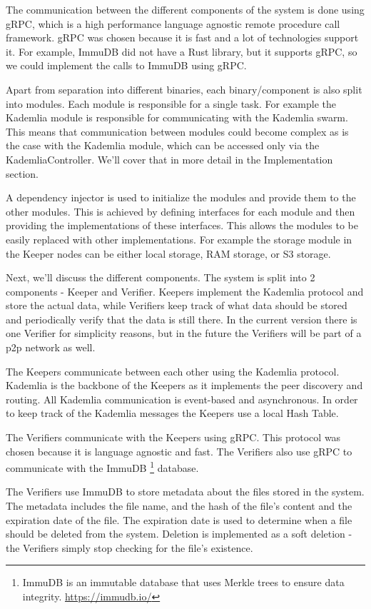 \documentclass[ twoside,openright,titlepage,numbers=noenddot,headinclude,%
                footinclude=true,cleardoublepage=empty,abstractoff, %
                BCOR=5mm,paper=a4,fontsize=11pt,%
                ngerman,american,%
                ]{scrreprt}
\begin{document}
The communication between the different components of the system is done using gRPC,
which is a high performance language agnostic remote procedure call framework.
gRPC was chosen because it is fast and a lot of technologies support it.
For example, ImmuDB did not have a Rust library, but it supports gRPC,
so we could implement the calls to ImmuDB using gRPC.

Apart from separation into different binaries, each binary/component is also split into modules.
Each module is responsible for a single task.
For example the Kademlia module is responsible for communicating with the Kademlia swarm.
This means that communication between modules could become complex as is the case with the Kademlia module,
which can be accessed only via the KademliaController.
We'll cover that in more detail in the Implementation section.

A dependency injector is used to initialize the modules and provide them to the other modules.
This is achieved by defining interfaces for each module and then providing the implementations of these interfaces.
This allows the modules to be easily replaced with other implementations.
For example the storage module in the Keeper nodes can be either local storage, RAM storage, or S3 storage.

Next, we'll discuss the different components.
The system is split into 2 components - Keeper and Verifier.
Keepers implement the Kademlia protocol and store the actual data,
while Verifiers keep track of what data should be stored and periodically verify that the data is still there.
In the current version there is one Verifier for simplicity reasons,
but in the future the Verifiers will be part of a p2p network as well.

The Keepers communicate between each other using the Kademlia protocol.
Kademlia is the backbone of the Keepers as it implements the peer discovery and routing.
All Kademlia communication is event-based and asynchronous.
In order to keep track of the Kademlia messages the Keepers use a local Hash Table.

The Verifiers communicate with the Keepers using gRPC.
This protocol was chosen because it is language agnostic and fast.
The Verifiers also use gRPC to communicate with the ImmuDB
\footnote{ImmuDB is an immutable database that uses Merkle trees to ensure data integrity. \url{https://immudb.io/}}
database.

The Verifiers use ImmuDB to store metadata about the files stored in the system.
The metadata includes the file name, and the hash of the file's content and the expiration date of the file.
The expiration date is used to determine when a file should be deleted from the system.
Deletion is implemented as a soft deletion - the Verifiers simply stop checking for the file's existence.
\end{document}
